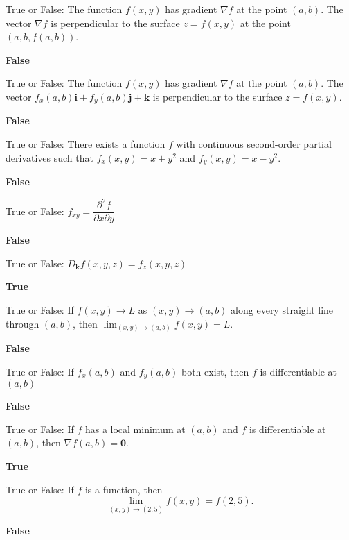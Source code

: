 \documentclass{exam}
\newcommand{\bi}{\mathbf{i}}
\newcommand{\bj}{\mathbf{j}}
\newcommand{\bk}{\mathbf{k}}
\newcommand{\bzero}{\mathbf{0}}
\begin{document}
\begin{questions}
		\question True or False: The function $f(x, y)$ has gradient $\nabla f$ at the point $(a, b)$. The vector $\nabla f$ is perpendicular to the surface $z=f(x,y)$ at the point $(a, b, f(a, b))$.
		 \begin{solution}
		 	\textbf{False}
		 \end{solution}
		
		\question True or False: The function $f(x, y)$ has gradient $\nabla f$ at the point $(a, b)$. The vector $f_x(a, b)\bi + f_y(a, b)\bj + \bk$ is perpendicular to the surface $z=f(x,y)$.
		\begin{solution}
			\textbf{False}
		\end{solution}
	
		\question True or False: There exists a function $f$ with continuous second-order partial derivatives such that $f_x(x,y)=x+y^2$ and $f_y(x,y)=x-y^2$.
		\begin{solution}
			\textbf{False}
		\end{solution}
		
		\question True or False: $f_{xy}=\dfrac{\partial^2 f}{\partial x \partial y}$
		\begin{solution}
			\textbf{False}
		\end{solution}
	
		\question True or False: $D_\bk f(x,y,z)=f_z(x,y,z)$
		\begin{solution}
			\textbf{True}
		\end{solution}
	
		\question True or False: If $f(x,y)\to L$ as $(x,y)\to (a,b)$ along every straight line through $(a,b)$, then $\displaystyle \lim_{(x,y)\to(a,b)} f(x,y) =L$.
		\begin{solution}
			\textbf{False}
		\end{solution}
		
		\question True or False: If $f_x(a,b)$ and $f_y(a,b)$ both exist, then $f$ is differentiable at $(a,b)$
		\begin{solution}
			\textbf{False}
		\end{solution}	
		
		\question True or False: If $f$ has a local minimum at $(a,b)$ and $f$ is differentiable at $(a,b)$, then $\nabla f(a,b)=\bzero$.
		\begin{solution}
			\textbf{True}
		\end{solution}
	
		\question True or False: If $f$ is a function, then \[\lim_{(x,y)\to(2,5)}f(x,y)=f(2,5). \]
		\begin{solution}
			\textbf{False}
		\end{solution}
		

\end{questions}
\end{document}
